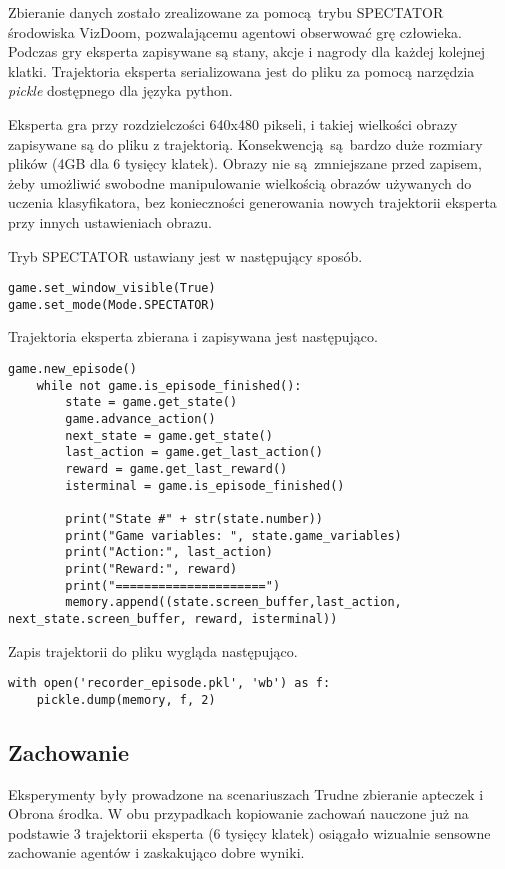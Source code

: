 Zbieranie danych zostało zrealizowane za pomocą trybu SPECTATOR środowiska VizDoom, pozwalającemu agentowi obserwować grę człowieka. Podczas gry eksperta zapisywane są stany, akcje i nagrody dla każdej kolejnej klatki. Trajektoria eksperta serializowana jest do pliku za pomocą narzędzia \textit{pickle} dostępnego dla języka python.

Eksperta gra przy rozdzielczości 640x480 pikseli, i takiej wielkości obrazy zapisywane są do pliku z trajektorią. Konsekwencją są bardzo duże rozmiary plików (4GB dla 6 tysięcy klatek). Obrazy nie są zmniejszane przed zapisem, żeby umożliwić swobodne manipulowanie wielkością obrazów używanych do uczenia klasyfikatora, bez konieczności generowania nowych trajektorii eksperta przy innych ustawieniach obrazu.

\vspace{5mm}

Tryb SPECTATOR ustawiany jest w następujący sposób.
\begin{lstlisting}[language=iPython]
game.set_window_visible(True)
game.set_mode(Mode.SPECTATOR)
\end{lstlisting}

Trajektoria eksperta zbierana i zapisywana jest następująco.

\begin{lstlisting}[language=iPython]
    game.new_episode()
    while not game.is_episode_finished():
        state = game.get_state()
        game.advance_action()
        next_state = game.get_state()
        last_action = game.get_last_action()
        reward = game.get_last_reward()
        isterminal = game.is_episode_finished()

        print("State #" + str(state.number))
        print("Game variables: ", state.game_variables)
        print("Action:", last_action)
        print("Reward:", reward)
        print("=====================")
        memory.append((state.screen_buffer,last_action, next_state.screen_buffer, reward, isterminal))
\end{lstlisting}

Zapis trajektorii do pliku wygląda następująco.

\begin{lstlisting}[language=iPython]
with open('recorder_episode.pkl', 'wb') as f:
    pickle.dump(memory, f, 2)
\end{lstlisting}

\subsection{Zachowanie}
Eksperymenty były prowadzone na scenariuszach Trudne zbieranie apteczek i Obrona środka.
W obu przypadkach kopiowanie zachowań nauczone już na podstawie 3 trajektorii eksperta (6 tysięcy klatek) osiągało wizualnie sensowne zachowanie agentów i zaskakująco dobre wyniki.

